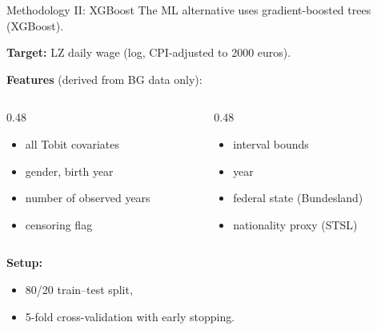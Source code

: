 \documentclass[10pt]{beamer}
\begin{document}
\begin{frame}{Methodology II: XGBoost}
The ML alternative uses gradient-boosted trees (XGBoost).

\vspace{0.2cm}
\textbf{Target:} LZ daily wage (log, CPI-adjusted to 2000 euros).

\vspace{0.2cm}
\textbf{Features} (derived from BG data only):
\begin{columns}[T]
\begin{column}{0.48\textwidth}
\begin{itemize}
    \item all Tobit covariates
    \item gender, birth year
    \item number of observed years
    \item censoring flag
\end{itemize}
\end{column}
\begin{column}{0.48\textwidth}
\begin{itemize}
    \item interval bounds
    \item year
    \item federal state (Bundesland)
    \item nationality proxy (STSL)
\end{itemize}
\end{column}
\end{columns}

\vspace{0.2cm}
\textbf{Setup:}
\begin{itemize}
    \item 80/20 train--test split,
    \item 5-fold cross-validation with early stopping.
\end{itemize}

\end{frame}
\end{document}
